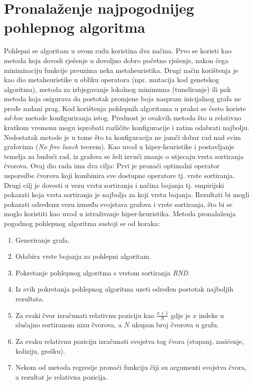 \documentclass[times, utf8, diplomski, numeric]{fer}
\begin{document}
\section{Pronalaženje najpogodnijeg pohlepnog algoritma}
\label{sec:ml}
Pohlepni se algoritam u ovom radu koristina dva načina. Prvo se koristi kao metoda koja dovodi rješenje u dovoljno dobro početno rješenje, nakon čega minimizaciju funkcije preuzima neka metaheuristika. Drugi način korištenja je kao dio metaheuristike u obliku operatora (npr. mutacija kod genetskog algoritma), metoda za izbjegavanje lokalnog minimuma (tuneliranje) ili pak metoda koja osigurava da postotak promjene boja naspram inicijalnog grafa ne prođe zadani prag. Kod korištenja pohlepnih algoritama u praksi se često koriste \emph{ad-hoc} metode konfiguriranja istog. Prednost je ovakvih metoda što u relativno kratkom vremenu mogu isprobati različite konfiguracije i zatim odabrati najbolju. Nedostatak metode je u tome što ta konfiguracija ne jamči dobar rad nad svim grafovima (\emph{No free lunch} teorem). Kao uvod u hiper-heuristike i postavljanje temelja za budući rad, iz grafova se želi izvući znanje o utjecaju vrsta sortiranja čvorova. Ovaj dio rada ima dva cilja: Prvi je pronaći optimalni operator usporedbe čvorova koji kombinira sve dostupne operatore tj. vrste sortiranja. Drugi cilj je dovesti u vezu vrstu sortiranja i načina bojanja tj. empirijski pokazati koja vrsta sortiranja je najbolja za koji vrstu bojanja. Rezultati bi mogli pokazati određenu vezu između svojstava grafova i vrste sortiranja, što bi se moglo koristiti kao uvod u istraživanje hiper-heuristika. Metoda pronalaženja pogodnog pohlepnog algoritma sastoji se od koraka:

\begin{enumerate}
	\item Generiranje grafa.
	\item Odabira vrste bojanja za pohlepni algoritam.
	\item Pokretanje pohlepnog algoritma s vrstom sortiranja \emph{RND}.
	\item Iz svih pokretanja pohlepnog algoritma uzeti određen postotak najboljih rezultata.
	\item Za svaki čvor izračunati relativnu poziciju kao $\frac{x+1}{N}$ gdje je $x$ indeks u slučajno sortiranom nizu čvorova, a $N$ ukupan broj čvorova u grafu. 
	\item Za svaku relativnu poziciju izračunati svojstva tog čvora (stupanj, zasićenje, koliziju, grešku).
	\item Nekom od metoda regresije pronaći funkciju čiji su argumenti svojstva čvora, a rezultat je relativna pozicija.
\end{enumerate}
\end{document}
